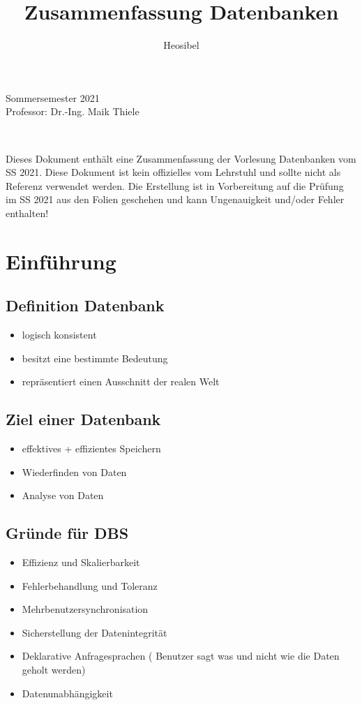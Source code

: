 \documentclass[a4paper]{article}
\title{Zusammenfassung Datenbanken}
\author{Heosibel}
\begin{document}
\maketitle


\begin{center}
    Sommersemester 2021 \\
    Professor: Dr.-Ing. Maik Thiele
\end{center}

\,

\begin{center}
    Dieses Dokument enthält eine Zusammenfassung der Vorlesung Datenbanken vom SS 2021.
    Diese Dokument ist kein offizielles vom Lehrstuhl und sollte nicht als Referenz verwendet werden.
    Die Erstellung ist in Vorbereitung auf die Prüfung im SS 2021 aus den Folien geschehen und kann Ungenauigkeit und/oder Fehler enthalten!
\end{center}


\newpage

\section{Einführung}

\subsection{Definition Datenbank}
\begin{itemize}
    \item logisch konsistent  
    \item besitzt eine bestimmte Bedeutung
    \item repräsentiert einen Ausschnitt der realen Welt
\end{itemize}

\subsection{Ziel einer Datenbank}
\begin{itemize}
    \item effektives + effizientes Speichern
    \item Wiederfinden von Daten
    \item Analyse von Daten
\end{itemize}

\subsection{Gründe für DBS}
\begin{itemize}
    \item Effizienz und Skalierbarkeit
    \item Fehlerbehandlung und Toleranz
    \item Mehrbenutzersynchronisation
    \item Sicherstellung der Datenintegrität
    \item Deklarative Anfragesprachen ( Benutzer sagt was und nicht wie die Daten geholt werden)
    \item Datenunabhängigkeit
\end{itemize}
\end{document}
